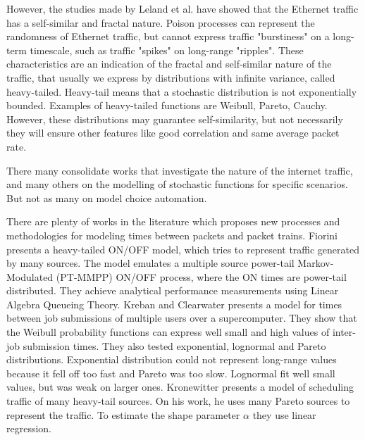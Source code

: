 However, the studies made by Leland et al.\cite{selfsimilar-ethernet} have showed that the Ethernet traffic has a self-similar and fractal nature. Poison processes can represent the randomness of Ethernet traffic, but cannot express traffic "burstiness" on a long-term timescale, such as traffic "spikes" on long-range "ripples". These characteristics are an indication of the fractal and self-similar nature of the traffic, that usually we express by distributions with infinite variance, called heavy-tailed. Heavy-tail means that a stochastic distribution is not exponentially bounded\cite{sourcesonoff-paper}. Examples of heavy-tailed functions are Weibull, Pareto, Cauchy.  However, these distributions may guarantee self-similarity, but not necessarily they will ensure other features like good correlation and same average packet rate.

There many consolidate works that investigate the nature of the internet traffic\cite{selfsimilar-ethernet}\cite{analysis-self-similar}\cite{stochartic-selfsimilar}\cite{selfsimilar-highvariability}\cite{multi-player-online-game-self-similarity}, and many others on the modelling of stochastic functions for specific scenarios\cite{estimation-renewal-function-ethernet-traffic}\cite{modelling-of-self-similar}\cite{empirical-interarrival-study}\cite{modeling-concurrent-heavy-tailed}\cite{optimal-scheduling-of-heavy-tailed-traffic}\cite{modelling-of-self-similar}. But not as many on model choice automation\cite{sourcesonoff-paper}.

There are plenty of works in the literature which proposes new processes and methodologies for modeling times between packets and packet trains. Fiorini \cite{modeling-concurrent-heavy-tailed} presents a heavy-tailed ON/OFF model, which tries to represent traffic generated by many sources. The model emulates a multiple source power-tail Markov-Modulated (PT-MMPP) ON/OFF process, where the ON times are power-tail distributed. They achieve analytical performance measurements using Linear Algebra Queueing Theory. Kreban and Clearwater\cite{hierarchical-dynamics-interarrival-times} presents a model for times between job submissions of multiple users over a supercomputer. They show that the Weibull probability functions can express well small and high values of inter-job submission times. They also tested exponential, lognormal and Pareto distributions. Exponential distribution could not represent long-range values because it fell off too fast and Pareto was too slow. Lognormal fit well small values, but was weak on larger ones. Kronewitter\cite{optimal-scheduling-of-heavy-tailed-traffic} presents a model of scheduling traffic of many heavy-tail sources. On his work, he uses many Pareto sources to represent the traffic. To estimate the shape parameter $\alpha$ they use linear regression.


